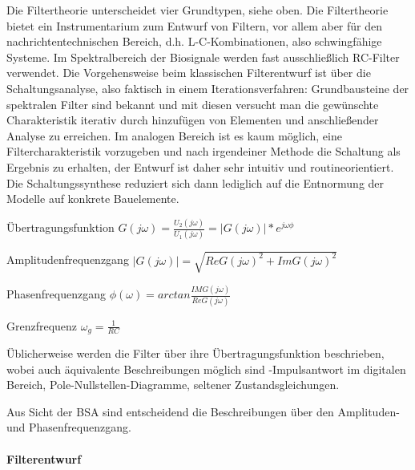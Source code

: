 \documentclass[a4paper]{article}
\begin{document}
\begin{multicols}{3}
\begin{itemize*}
    \item Die Filtertheorie unterscheidet vier Grundtypen, siehe oben. Die Filtertheorie bietet ein Instrumentarium zum Entwurf von Filtern, vor allem aber für den nachrichtentechnischen Bereich, d.h. L-C-Kombinationen, also schwingfähige Systeme. Im Spektralbereich der Biosignale werden fast ausschließlich RC-Filter verwendet. Die Vorgehensweise beim klassischen Filterentwurf ist über die Schaltungsanalyse, also faktisch in einem Iterationsverfahren: Grundbausteine der spektralen Filter sind bekannt und mit diesen versucht man die gewünschte Charakteristik iterativ durch hinzufügen von Elementen und anschließender Analyse zu erreichen. Im analogen Bereich ist es kaum möglich, eine Filtercharakteristik vorzugeben und nach irgendeiner Methode die Schaltung als Ergebnis zu erhalten, der Entwurf ist daher sehr intuitiv und routineorientiert. Die Schaltungssynthese reduziert sich dann lediglich auf die Entnormung der Modelle auf konkrete Bauelemente.
    \begin{itemize*}
      \item Übertragungsfunktion $G(j\omega)=\frac{U_2(j\omega)}{U_1(j\omega)}=| G(j\omega)|*e^{j\omega\phi}$
      \item Amplitudenfrequenzgang $|G(j\omega)|=\sqrt{Re{G(j\omega)}^2 +Im{G(j\omega)}^2}$
      \item Phasenfrequenzgang $\phi(\omega)=arctan\frac{IM{G(j\omega)}}{Re{G(j\omega)}}$
      \item Grenzfrequenz $\omega_g=\frac{1}{RC}$
    \end{itemize*}
    \item Üblicherweise werden die Filter über ihre Übertragungsfunktion beschrieben, wobei auch äquivalente Beschreibungen möglich sind -Impulsantwort im digitalen Bereich, Pole-Nullstellen-Diagramme, seltener Zustandsgleichungen.
    \item Aus Sicht der BSA sind entscheidend die Beschreibungen über den Amplituden- und Phasenfrequenzgang.
  \end{itemize*}

  \paragraph{Filterentwurf}\label{filterentwurf}


\end{multicols}
\end{document}
